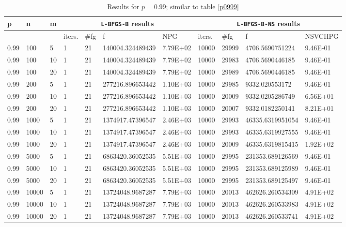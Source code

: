 \begin{table}
  \tiny
  \begin{center}
    \begin{tabular}{|l|l|l|l|l|l|l|l|l|l|l|}
      \hline
      p  & n & m  & \multicolumn{4}{|c|}{\texttt{L-BFGS-B} results} & \multicolumn{4}{|c|}{\texttt{L-BFGS-B-NS} results} \\ \hline
      &  &  & iters. & \#fg & f & NPG & iters. & \#fg & f & NSVCHPG \\ \hline
      0.99 & 100 & 5 & 1 & 21 & 140004.324489439 & 7.79E+02 & 10000 & 29999 & 4706.5690751224 & 9.46E-01\\
      0.99 & 100 & 10 & 1 & 21 & 140004.324489439 & 7.79E+02 & 10000 & 29983 & 4706.5690446185 & 9.46E-01\\
      0.99 & 100 & 20 & 1 & 21 & 140004.324489439 & 7.79E+02 & 10000 & 29989 & 4706.5690446185 & 9.46E-01\\
      0.99 & 200 & 5 & 1 & 21 & 277216.896653442 & 1.10E+03 & 10000 & 29985 & 9332.020553172 & 9.46E-01\\
      0.99 & 200 & 10 & 1 & 21 & 277216.896653442 & 1.10E+03 & 10000 & 20009 & 9332.0205286749 & 6.56E+01\\
      0.99 & 200 & 20 & 1 & 21 & 277216.896653442 & 1.10E+03 & 10000 & 20007 & 9332.0182250141 & 8.21E+01\\
      0.99 & 1000 & 5 & 1 & 21 & 1374917.47396547 & 2.46E+03 & 10000 & 29993 & 46335.6319951054 & 9.46E-01\\
      0.99 & 1000 & 10 & 1 & 21 & 1374917.47396547 & 2.46E+03 & 10000 & 29993 & 46335.6319927555 & 9.46E-01\\
      0.99 & 1000 & 20 & 1 & 21 & 1374917.47396547 & 2.46E+03 & 10000 & 20009 & 46335.6319815415 & 1.92E+02\\
      0.99 & 5000 & 5 & 1 & 21 & 6863420.36052535 & 5.51E+03 & 10000 & 29995 & 231353.689126569 & 9.46E-01\\
      0.99 & 5000 & 10 & 1 & 21 & 6863420.36052535 & 5.51E+03 & 10000 & 29995 & 231353.689125989 & 9.46E-01\\
      0.99 & 5000 & 20 & 1 & 21 & 6863420.36052535 & 5.51E+03 & 10000 & 29995 & 231353.689125497 & 9.46E-01\\
      0.99 & 10000 & 5 & 1 & 21 & 13724048.9687287 & 7.79E+03 & 10000 & 20013 & 462626.260534309 & 4.91E+02\\
      0.99 & 10000 & 10 & 1 & 21 & 13724048.9687287 & 7.79E+03 & 10000 & 20013 & 462626.260533983 & 4.91E+02\\
      0.99 & 10000 & 20 & 1 & 21 & 13724048.9687287 & 7.79E+03 & 10000 & 20013 & 462626.260533741 & 4.91E+02\\
      \hline
    \end{tabular}
    \caption[A value where \texttt{L-BFGS-B-NS} is supposed to fail. $p = 0.99$]{Results for $p = 0.99$; similar to table \ref{p0999}}
    \label{p099}
  \end{center}
\end{table}

